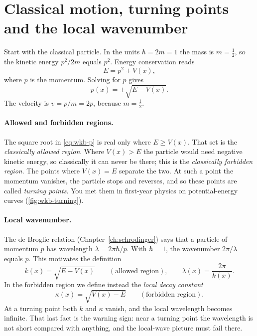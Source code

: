 \section{Classical motion, turning points and the local wavenumber}\label{sec:wkb-classical}

Start with the classical particle. In the units $\hbar=2m=1$ the mass is $m=\tfrac12$, so the kinetic energy $p^2/2m$ equals $p^2$. Energy conservation reads
\begin{equation}
E=p^2+V(x),
\label{eq:wkb-energy}
\end{equation}
where $p$ is the momentum. Solving for $p$ gives
\begin{equation}
p(x)=\pm\sqrt{E-V(x)}.
\label{eq:wkb-p}
\end{equation}
The velocity is $v=p/m=2p$, because $m=\tfrac12$.

\paragraph{Allowed and forbidden regions.} The square root in \cref{eq:wkb-p} is real only where $E\ge V(x)$. That set is the \emph{classically allowed region}. Where $V(x)>E$ the particle would need negative kinetic energy, so classically it can never be there; this is the \emph{classically forbidden region}. The points where $V(x)=E$ separate the two. At such a point the momentum vanishes, the particle stops and reverses, and so these points are called \emph{turning points}. You met them in first-year physics on potential-energy curves (\cref{fig:wkb-turning}).

\paragraph{Local wavenumber.} The de Broglie relation (Chapter~\ref{ch:schrodinger}) says that a particle of momentum $p$ has wavelength $\lambda=2\pi\hbar/p$. With $\hbar=1$, the wavenumber $2\pi/\lambda$ equals $p$. This motivates the definition
\begin{equation}
k(x)=\sqrt{E-V(x)}\qquad(\text{allowed region}),\qquad \lambda(x)=\frac{2\pi}{k(x)}.
\label{eq:wkb-k}
\end{equation}
In the forbidden region we define instead the \emph{local decay constant}
\begin{equation}
\kappa(x)=\sqrt{V(x)-E}\qquad(\text{forbidden region}).
\label{eq:wkb-kappa}
\end{equation}
At a turning point both $k$ and $\kappa$ vanish, and the local wavelength becomes infinite. That last fact is the warning sign: near a turning point the wavelength is not short compared with anything, and the local-wave picture must fail there.

